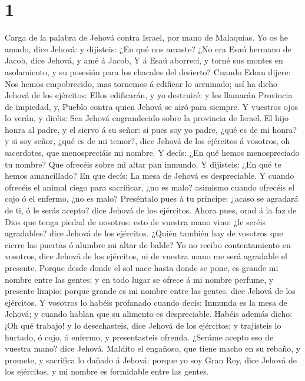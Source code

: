 \hypertarget{section}{%
\section{1}\label{section}}

 Carga de la palabra de Jehová contra Israel, por mano de
Malaquías.  Yo os he amado, dice Jehová: y dijisteis: ¿En
qué nos amaste? ¿No era Esaú hermano de Jacob, dice Jehová, y amé á
Jacob,  Y á Esaú aborrecí, y torné sus montes en
asolamiento, y su posesión para los chacales del desierto?
 Cuando Edom dijere: Nos hemos empobrecido, mas tornemos á
edificar lo arruinado; así ha dicho Jehová de los ejércitos: Ellos
edificarán, y yo destruiré: y les llamarán Provincia de impiedad, y,
Pueblo contra quien Jehová se airó para siempre.  Y
vuestros ojos lo verán, y diréis: Sea Jehová engrandecido sobre la
provincia de Israel.  El hijo honra al padre, y el siervo
á su señor: si pues soy yo padre, ¿qué es de mi honra? y si soy señor,
¿qué es de mi temor?, dice Jehová de los ejércitos á vosotros, oh
sacerdotes, que menospreciáis mi nombre. Y decís: ¿En qué hemos
menospreciado tu nombre?  Que ofrecéis sobre mi altar pan
inmundo. Y dijisteis: ¿En qué te hemos amancillado? En que decís: La
mesa de Jehová es despreciable.  Y cuando ofrecéis el
animal ciego para sacrificar, ¿no es malo? asimismo cuando ofrecéis el
cojo ó el enfermo, ¿no es malo? Preséntalo pues á tu príncipe: ¿acaso se
agradará de ti, ó le serás acepto? dice Jehová de los ejércitos.
 Ahora pues, orad á la faz de Dios que tenga piedad de
nosotros: esto de vuestra mano vino: ¿le seréis agradables? dice Jehová
de los ejércitos.  ¿Quién también hay de vosotros que
cierre las puertas ó alumbre mi altar de balde? Yo no recibo
contentamiento en vosotros, dice Jehová de los ejércitos, ni de vuestra
mano me será agradable el presente.  Porque desde donde
el sol nace hasta donde se pone, es grande mi nombre entre las gentes; y
en todo lugar se ofrece á mi nombre perfume, y presente limpio: porque
grande es mi nombre entre las gentes, dice Jehová de los ejércitos.
 Y vosotros lo habéis profanado cuando decís: Inmunda es
la mesa de Jehová; y cuando hablan que su alimento es despreciable.
 Habéis además dicho: ¡Oh qué trabajo! y lo desechasteis,
dice Jehová de los ejércitos; y trajisteis lo hurtado, ó cojo, ó
enfermo, y presentasteis ofrenda. ¿Seráme acepto eso de vuestra mano?
dice Jehová.  Maldito el engañoso, que tiene macho en su
rebaño, y promete, y sacrifica lo dañado á Jehová: porque yo soy Gran
Rey, dice Jehová de los ejércitos, y mi nombre es formidable entre las
gentes.

